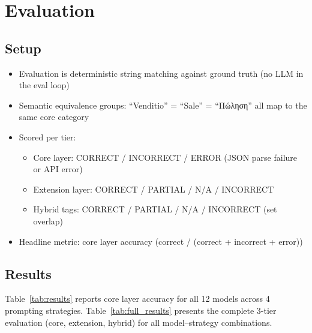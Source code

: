 \documentclass[10pt, a4paper]{article}
\begin{document}
\section{Evaluation}

\subsection{Setup}

\begin{itemize}
\item Evaluation is deterministic string matching against ground truth (no LLM in the eval loop)
\item Semantic equivalence groups: ``Venditio'' = ``Sale'' = ``Πώληση'' all map to the same core category
\item Scored per tier:
  \begin{itemize}
  \item Core layer: CORRECT / INCORRECT / ERROR (JSON parse failure or API error)
  \item Extension layer: CORRECT / PARTIAL / N/A / INCORRECT
  \item Hybrid tags: CORRECT / PARTIAL / N/A / INCORRECT (set overlap)
  \end{itemize}
\item Headline metric: core layer accuracy (correct / (correct + incorrect + error))
\end{itemize}

\subsection{Results}

Table~\ref{tab:results} reports core layer accuracy for all 12 models across 4 prompting strategies. Table~\ref{tab:full_results} presents the complete 3-tier evaluation (core, extension, hybrid) for all model--strategy combinations.
\end{document}
